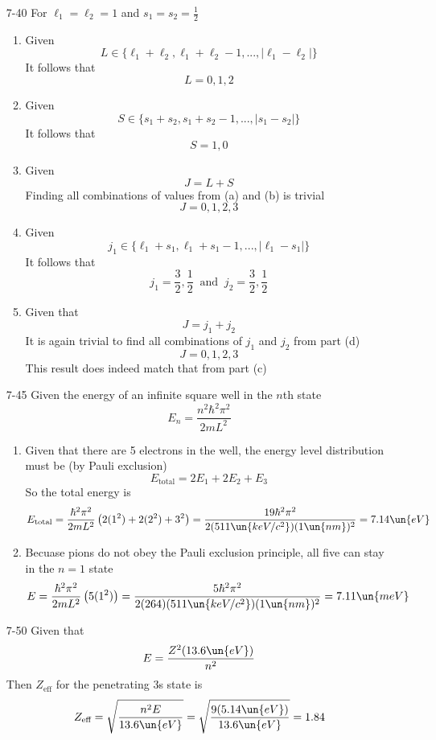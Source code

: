 \documentclass[12pt]{2620hw}
\begin{document}
\begin{enumerate}
\item [7-40] For $\ell_1 = \ell_2 = 1$ and $s_1 = s_2 = \frac{1}{2}$
\begin{enumerate}
	\item Given
	\[
		L \in \{\ell_1 + \ell_2, \ell_1 + \ell_2 -1, ..., |\ell_1 - \ell_2 | \}
	\]
	It follows that 
	\[
		L = 0,1,2
	\]
	\item Given
	\[
		S \in \{s_1 + s_2, s_1 + s_2 -1, ..., |s_1 - s_2 | \}
	\]
	It follows that
	\[
		S = 1, 0
	\]
	\item Given 
	\[
		J = L + S
	\]
	Finding all combinations of values from (a) and (b) is trivial
	\[
		J = 0,1,2,3	
	\]
	\item Given 
	\[
		j_1 \in \{\ell_1 + s_1, \ell_1 + s_1 -1, ..., |\ell_1 - s_1 | \}
	\]
	It follows that 
	\[
		j_1 =  \frac{3}{2}, \frac{1}{2} \;\; \text{and} \;\; j_2 =  \frac{3}{2}, \frac{1}{2}
	\]
	\item Given that 
	\[
		J = j_1 + j_2
	\]
	It is again trivial to find all combinations of $j_1$ and $j_2$ from part (d)
	\[
		J = 0,1,2,3
	\]
	This result does indeed match that from part (c)
\end{enumerate}

\item [7-45] Given the energy of an infinite square well in the $n$th state
\[
	E_n = \frac{n^2 \hbar^2 \pi^2}{2mL^2}
\]
\begin{enumerate}
	\item Given that there are 5 electrons in the well, the energy level distribution must be (by Pauli exclusion)
	\[
		E_{ \text{total} } = 2E_1 + 2E_2 + E_3
	\]
	So the total energy is 
	\[
		E_{ \text{total} } = \frac{\hbar^2 \pi^2}{2mL^2} \left( 2(1^2) + 2(2^2) + 3^2 \right) =  \frac{19\hbar^2 \pi^2}{2(511\un{keV/c^2})(1 \un{nm})^2}= 7.14\un{eV} 
	\]
	\item Becuase pions do not obey the Pauli exclusion principle, all five can stay in the $n=1$ state
	\[
		E = \frac{\hbar^2 \pi^2}{2mL^2} \left( 5(1^2) \right) =\frac{5\hbar^2 \pi^2}{2(264)(511\un{keV/c^2})(1 \un{nm})^2}= 7.11\un{meV} 
	\]
\end{enumerate}

\item [7-50] Given that 
\[
	E = \frac{Z^2(13.6\un{eV})}{n^2} 
\]
Then $Z_{ \text{eff}}$ for the penetrating 3s state is 
\[
	Z_{ \text{eff} } = \sqrt{ \frac{n^2E}{13.6\un{eV}} } = \sqrt{ \frac{9(5.14\un{eV})}{13.6\un{eV}} } = 1.84
\]


\end{enumerate}
\end{document}
